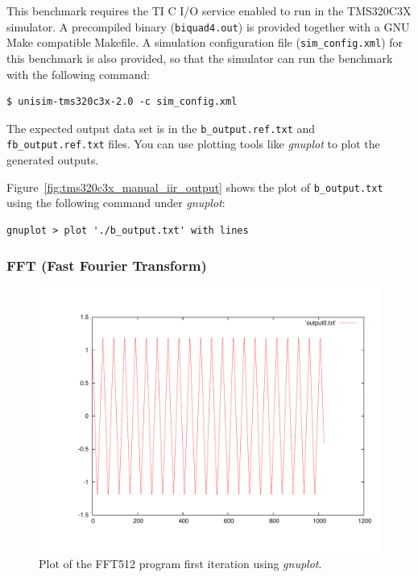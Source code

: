 This benchmark requires the TI C I/O service enabled to run in the TMS320C3X simulator.
A precompiled binary (\texttt{biquad4.out}) is provided together with a GNU Make compatible Makefile.
A simulation configuration file (\texttt{sim\_config.xml}) for this benchmark is also provided, so that the simulator can run the benchmark with the following command:
  
\begin{verbatim}
$ unisim-tms320c3x-2.0 -c sim_config.xml
\end{verbatim}

The expected output data set is in the \texttt{b\_output.ref.txt} and \texttt{fb\_output.ref.txt} files.
You can use plotting tools like \textit{gnuplot} to plot the generated outputs. 

Figure~\ref{fig:tms320c3x_manual_iir_output} shows the plot of \texttt{b\_output.txt} using the following command under \textit{gnuplot}:

\begin{verbatim}
gnuplot > plot './b_output.txt' with lines
\end{verbatim}

\subsubsection{FFT (Fast Fourier Transform)}

\begin{figure}[!h]
	\begin{center}
		\includegraphics[width=.8\textwidth]{tms320c3x/fig_fft512_output0.pdf}
		\caption{\label{fig:tms320c3x_manual_fft_output0}Plot of the FFT512 program first iteration using \textit{gnuplot}.}
	\end{center}
\end{figure}

